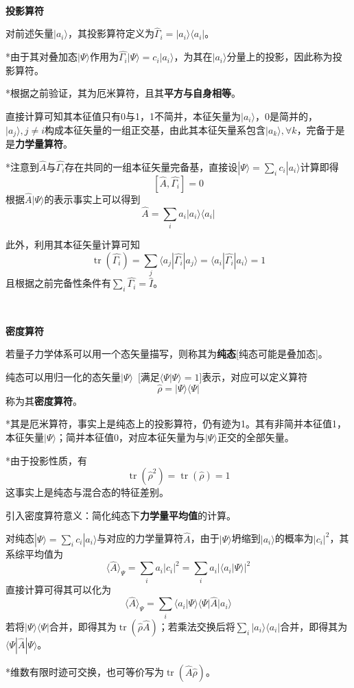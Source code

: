 \documentclass[a4paper,UTF8,fontset=windows]{ctexart}
\newcommand*{\ket}[1]{|#1\rangle}
\newcommand*{\bra}[1]{\langle#1|}
\newcommand*{\bk}[2]{\langle#1|#2\rangle}
\newcommand*{\blk}[3]{\langle#1|#2|#3\rangle}
\DeclareMathOperator{\tr}{tr}
\begin{document}
\

\textbf{投影算符}

对前述矢量$\ket{a_i}$，其投影算符定义为$\hat{\Gamma}_i=\ket{a_i}\bra{a_i}$。

*由于其对叠加态$\ket{\Psi}$作用为$\hat{\Gamma_i}\ket{\Psi}=c_i\ket{a_i}$，为其在$\ket{a_i}$分量上的投影，因此称为投影算符。

*根据之前验证，其为厄米算符，且其\textbf{平方与自身相等}。

直接计算可知其本征值只有0与1，1不简并，本征矢量为$\ket{a_i}$，0是简并的，$\ket{a_j},j\ne i$构成本征矢量的一组正交基，由此其本征矢量系包含$\ket{a_k},\forall k$，完备于是是\textbf{力学量算符}。

*注意到$\hat{A}$与$\hat{\Gamma_i}$存在共同的一组本征矢量完备基，直接设$\ket{\Psi}=\sum_ic_i\ket{a_i}$计算即得
$$[\hat{A},\hat{\Gamma_i}]=0$$
根据$\hat{A}\ket{\Psi}$的表示事实上可以得到
$$\hat{A}=\sum_ia_i\ket{a_i}\bra{a_i}$$

此外，利用其本征矢量计算可知
$$\tr(\hat{\Gamma_i})=\sum_j\blk{a_j}{\hat{\Gamma_i}}{a_j}=\blk{a_i}{\hat{\Gamma_i}}{a_i}=1$$
且根据之前完备性条件有$\sum_i\hat{\Gamma_i}=\hat{I}$。

\

\textbf{密度算符}

若量子力学体系可以用一个态矢量描写，则称其为\textbf{纯态}[纯态可能是叠加态]。

纯态可以用归一化的态矢量$\ket{\Psi}$\ [满足$\bk{\Psi}{\Psi}=1$]表示，对应可以定义算符
$$\hat{\rho}=\ket{\Psi}\bra{\Psi}$$
称为其\textbf{密度算符}。

*其是厄米算符，事实上是纯态上的投影算符，仍有迹为1。其有非简并本征值1，本征矢量$\ket{\Psi}$；简并本征值0，对应本征矢量为与$\ket{\Psi}$正交的全部矢量。

*由于投影性质，有
$$\tr(\hat{\rho}^2)=\tr(\hat{\rho})=1$$
这事实上是纯态与混合态的特征差别。

引入密度算符意义：简化纯态下\textbf{力学量平均值}的计算。

对纯态$\ket{\Psi}=\sum_ic_i\ket{a_i}$与对应的力学量算符$\hat{A}$，由于$\ket{\Psi}$坍缩到$\ket{a_i}$的概率为$|c_i|^2$，其系综平均值为
$$\langle\hat{A}\rangle_\Psi=\sum_ia_i|c_i|^2=\sum_ia_i|\bk{a_i}{\Psi}|^2$$
直接计算可得其可以化为
$$\langle\hat{A}\rangle_\Psi=\sum_i\bk{a_i}{\Psi}\blk{\Psi}{\hat{A}}{a_i}$$
若将$\ket{\Psi}\bra{\Psi}$合并，即得其为$\tr(\hat{\rho}\hat{A})$；若乘法交换后将$\sum_i\ket{a_i}\bra{a_i}$合并，即得其为$\blk{\Psi}{\hat{A}}{\Psi}$。

*维数有限时迹可交换，也可等价写为$\tr(\hat{A}\hat{\rho})$。
\end{document}
